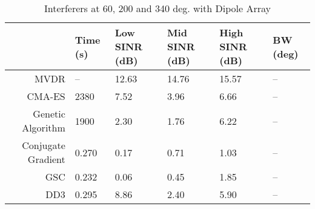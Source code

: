 \begin{table}[ht]
\centering
\caption{Interferers at 60, 200 and 340 deg. with Dipole Array} 
\label{tab:feko60_200_340}
\begin{tabular}{rlllll}
  \hline
 & Time (s) & Low SINR (dB) & Mid SINR (dB) & High SINR (dB) & BW (deg) \\ 
  \hline
MVDR & -- & 12.63 & 14.76 & 15.57 & -- \\ 
  CMA-ES & 2380 & 7.52 & 3.96 & 6.66 & -- \\ 
  Genetic Algorithm & 1900 & 2.30 & 1.76 & 6.22 & -- \\ 
  Conjugate Gradient & 0.270 & 0.17 & 0.71 & 1.03 & -- \\ 
  GSC & 0.232 & 0.06 & 0.45 & 1.85 & -- \\ 
  DD3 & 0.295 & 8.86 & 2.40 & 5.90 & -- \\ 
   \hline
\end{tabular}
\end{table}
